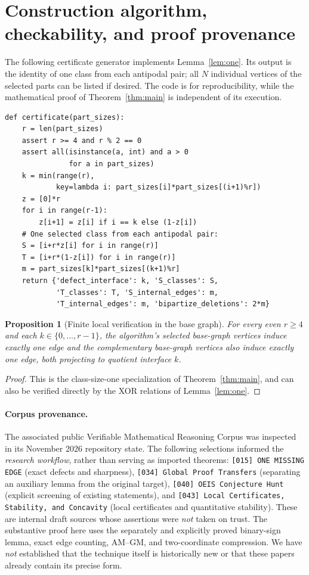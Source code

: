 \documentclass[11pt,a4paper]{article}
\newtheorem{proposition}[theorem]{Proposition}
\begin{document}
\section{Construction algorithm, checkability, and proof provenance}
The following certificate generator implements Lemma~\ref{lem:one}. Its output is the identity of one class from each antipodal pair; all $N$ individual vertices of the selected parts can be listed if desired. The code is for reproducibility, while the mathematical proof of Theorem~\ref{thm:main} is independent of its execution.
\begin{lstlisting}[style=py,caption={Deterministic O(r) generator of a half-set and cut certificate.}]
def certificate(part_sizes):
    r = len(part_sizes)
    assert r >= 4 and r % 2 == 0
    assert all(isinstance(a, int) and a > 0
               for a in part_sizes)
    k = min(range(r),
            key=lambda i: part_sizes[i]*part_sizes[(i+1)%r])
    z = [0]*r
    for i in range(r-1):
        z[i+1] = z[i] if i == k else (1-z[i])
    # One selected class from each antipodal pair:
    S = [i+r*z[i] for i in range(r)]
    T = [i+r*(1-z[i]) for i in range(r)]
    m = part_sizes[k]*part_sizes[(k+1)%r]
    return {'defect_interface': k, 'S_classes': S,
            'T_classes': T, 'S_internal_edges': m,
            'T_internal_edges': m, 'bipartize_deletions': 2*m}
\end{lstlisting}
\begin{proposition}[Finite local verification in the base graph]\label{prop:test}
For every even $r\ge4$ and each $k\in\{0,\ldots,r-1\}$, the algorithm's selected base-graph vertices induce exactly one edge and the complementary base-graph vertices also induce exactly one edge, both projecting to quotient interface $k$.
\end{proposition}
\begin{proof}
This is the class-size-one specialization of Theorem~\ref{thm:main}, and can also be verified directly by the XOR relations of Lemma~\ref{lem:one}.
\end{proof}
\paragraph{Corpus provenance.}
The associated public Verifiable Mathematical Reasoning Corpus \cite{Corpus} was inspected in its November 2026 repository state. The following selections informed the \emph{research workflow}, rather than serving as imported theorems: \texttt{[015] ONE MISSING EDGE} (exact defects and sharpness), \texttt{[034] Global Proof Transfers} (separating an auxiliary lemma from the original target), \texttt{[040] OEIS Conjecture Hunt} (explicit screening of existing statements), and \texttt{[043] Local Certificates, Stability, and Concavity} (local certificates and quantitative stability). These are internal draft sources whose assertions were \emph{not} taken on trust. The substantive proof here uses the separately and explicitly proved binary-sign lemma, exact edge counting, AM--GM, and two-coordinate compression. We have \emph{not} established that the technique itself is historically new or that these papers already contain its precise form.
\end{document}
